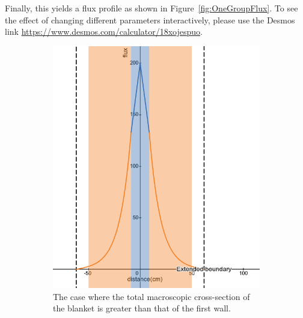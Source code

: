 \documentclass[a4paper, 12pt]{article}
\begin{document}
Finally, this yields a flux profile as shown in Figure~\ref{fig:OneGroupFlux}. To see the effect of changing different parameters interactively, please use the Desmos link \url{https://www.desmos.com/calculator/18xojespuo}.
\begin{figure}
  \begin{subfigure}[b]{0.4\textwidth}
    \includegraphics[width=\textwidth]{OneGroupFluxBlanketAbs.png}
    \caption{The case where the total macroscopic cross-section of the blanket is greater than that of the first wall.}
    \label{fig:OneGroupFluxBlanketAbs}
  \end{subfigure}
  \hfill
  \begin{subfigure}[b]{0.4\textwidth}

\end{subfigure}
\end{figure}
\end{document}
